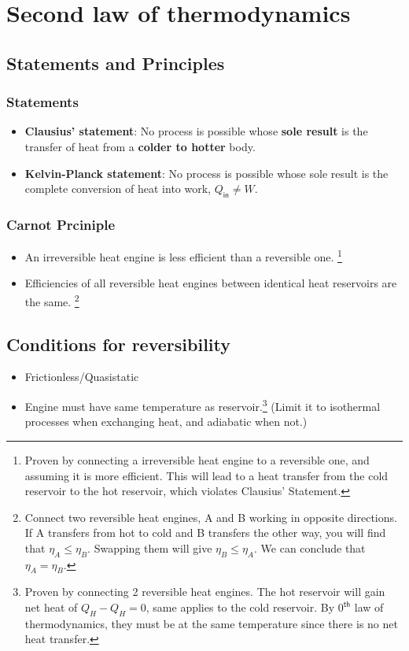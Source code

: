 \section{Second law of thermodynamics}
\subsection{Statements and Principles}
\subsubsection{Statements}
\begin{itemize}
    \item \textbf{Clausius' statement}: No process is possible whose \textbf{sole result} is the transfer of heat from a \textbf{colder to hotter} body. 
    \item \textbf{Kelvin-Planck statement}: No process is possible whose sole result is the complete conversion of heat into work, $Q_{\textsf{in}}\neq W$.
\end{itemize}

\subsubsection{Carnot Prciniple}
\begin{itemize}
    \item An irreversible heat engine is less efficient than a reversible one. \footnote{Proven by connecting a irreversible heat engine to a reversible one, and assuming it is more efficient. This will lead to a heat transfer from the cold reservoir to the hot reservoir, which violates Clausius' Statement.}
    \item Efficiencies of all reversible heat engines between identical heat reservoirs are the same. \footnote{Connect two reversible heat engines, A and B working in opposite directions. If A transfers from hot to cold and B transfers the other way, you will find that $\eta_A \leq \eta_B$. Swapping them will give $\eta_B \leq \eta_A$. We can conclude that $\eta_A=\eta_B$.}
\end{itemize}

\subsection{Conditions for reversibility}
\begin{itemize}
    \item Frictionless/Quasistatic
    \item Engine must have same temperature as reservoir.\footnote{Proven by connecting 2 reversible heat engines. The hot reservoir will gain net heat of $Q_H-Q_H=0$, same applies to the cold reservoir. By $0^{\textsf{th}}$ law of thermodynamics, they must be at the same temperature since there is no net heat transfer.} (Limit it to isothermal processes when exchanging heat, and adiabatic when not.)
\end{itemize}


